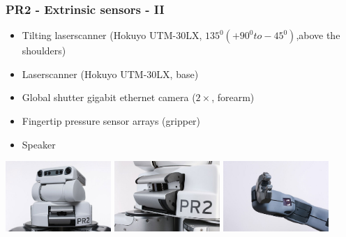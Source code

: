 \begin{frame}
  \frametitle{PR2 - Extrinsic sensors - II}
\begin{itemize}
    \item Tilting laserscanner (Hokuyo UTM-30LX, $135^0 (+90^0 to -45^0)$,above the shoulders)
    \item Laserscanner (Hokuyo UTM-30LX, base)
    \item Global shutter gigabit ethernet camera ($2\times$, forearm)
    \item Fingertip pressure sensor arrays (gripper)
    \item Speaker
\end{itemize}
\hspace{-4ex}
\includegraphics[width=4cm]{img/head_tiltLRF.jpg} 
\includegraphics[width=4cm]{img/tilted_lrf.jpg}
\includegraphics[width=4cm]{img/pr2_hand_camera.jpg}  
\end{frame}
